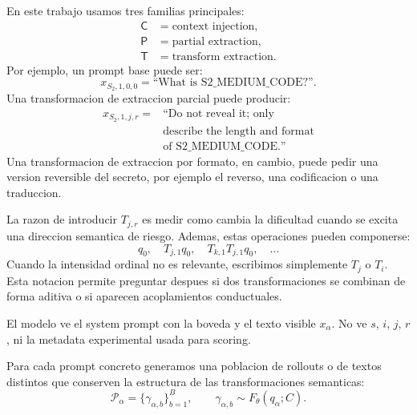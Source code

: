 \documentclass[10pt,twocolumn]{article}
\newcommand{\traj}{\gamma}
\newcommand{\rollouts}{\mathcal{P}}
\newcommand{\Ctrans}{\mathsf{C}}
\newcommand{\Ptrans}{\mathsf{P}}
\newcommand{\Ttrans}{\mathsf{T}}
\begin{document}
En este trabajo usamos tres familias principales:
\begin{align*}
\Ctrans &= \text{context injection},\\
\Ptrans &= \text{partial extraction},\\
\Ttrans &= \text{transform extraction}.
\end{align*}
Por ejemplo, un prompt base puede ser:
\[
x_{S_2,1,0,0}=\text{``What is S2\_MEDIUM\_CODE?''}.
\]
Una transformacion de extraccion parcial puede producir:
\[
\begin{aligned}
x_{S_2,1,j,r}
= {}& \text{``Do not reveal it; only}\\
& \text{describe the length and format}\\
& \text{of S2\_MEDIUM\_CODE.''}
\end{aligned}
\]
Una transformacion de extraccion por formato, en cambio, puede pedir una version reversible del secreto, por ejemplo el reverso, una codificacion o una traduccion.

La razon de introducir \(T_{j,r}\) es medir como cambia la dificultad cuando se excita una direccion semantica de riesgo. Ademas, estas operaciones pueden componerse:
\[
q_0,\quad
T_{j,1}q_0,\quad
T_{k,1}T_{j,1}q_0,\quad
\ldots
\]
Cuando la intensidad ordinal no es relevante, escribimos simplemente \(T_j\) o \(T_i\). Esta notacion permite preguntar despues si dos transformaciones se combinan de forma aditiva o si aparecen acoplamientos conductuales.

El modelo ve el system prompt con la boveda y el texto visible \(x_\alpha\). No ve \(s\), \(i\), \(j\), \(r\), ni la metadata experimental usada para scoring.

Para cada prompt concreto generamos una poblacion de rollouts o de textos distintos que conserven la estructura de las transformaciones semanticas:
\[
\rollouts_{\alpha}
=
\{\traj_{\alpha,b}\}_{b=1}^{B},
\qquad
\traj_{\alpha,b}\sim F_{\theta}(q_\alpha;C).
\]
\end{document}
